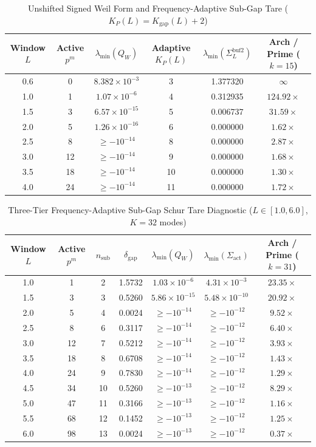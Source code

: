 \documentclass[11pt,a4paper]{article}
\begin{document}
\begin{table}[htbp]
\centering
\caption{Unshifted Signed Weil Form and Frequency-Adaptive Sub-Gap Tare ($K_P(L) = K_{\mathrm{gap}}(L) + 2$)}
\begin{tabular}{cccccc}
\toprule
Window $L$ & Active $p^m$ & $\lambda_{\min}(Q_W)$ & Adaptive $K_P(L)$ & $\lambda_{\min}(\Sigma_L^{\mathrm{buf2}})$ & Arch / Prime ($k=15$) \\
\midrule
0.6 & 0 & $8.382\times 10^{-3}$ & 3 & 1.377320 & $\infty$ \\
1.0 & 1 & $1.07\times 10^{-6}$ & 4 & 0.312935 & $124.92\times$ \\
1.5 & 3 & $6.57\times 10^{-15}$ & 5 & 0.006737 & $31.59\times$ \\
2.0 & 5 & $1.26\times 10^{-16}$ & 6 & 0.000000 & $1.62\times$ \\
2.5 & 8 & $\ge -10^{-14}$ & 8 & 0.000000 & $2.87\times$ \\
3.0 & 12 & $\ge -10^{-14}$ & 9 & 0.000000 & $1.68\times$ \\
3.5 & 18 & $\ge -10^{-14}$ & 10 & 0.000000 & $1.30\times$ \\
4.0 & 24 & $\ge -10^{-14}$ & 11 & 0.000000 & $1.72\times$ \\
\bottomrule
\end{tabular}
\end{table}

\begin{table}[htbp]
\centering
\caption{Three-Tier Frequency-Adaptive Sub-Gap Schur Tare Diagnostic ($L \in [1.0, 6.0]$, $K = 32$ modes)}
\begin{tabular}{ccccccc}
\toprule
Window $L$ & Active $p^m$ & $n_{\mathrm{sub}}$ & $\delta_{\mathrm{gap}}$ & $\lambda_{\min}(Q_W)$ & $\lambda_{\min}(\Sigma_{\mathrm{act}})$ & Arch / Prime ($k=31$) \\
\midrule
1.0 & 1 & 2 & 1.5732 & $1.03\times 10^{-6}$ & $4.31\times 10^{-3}$ & $23.35\times$ \\
1.5 & 3 & 3 & 0.5260 & $5.86\times 10^{-15}$ & $5.48\times 10^{-10}$ & $20.92\times$ \\
2.0 & 5 & 4 & 0.0024 & $\ge -10^{-14}$ & $\ge -10^{-12}$ & $9.52\times$ \\
2.5 & 8 & 6 & 0.3117 & $\ge -10^{-14}$ & $\ge -10^{-12}$ & $6.40\times$ \\
3.0 & 12 & 7 & 0.5212 & $\ge -10^{-14}$ & $\ge -10^{-12}$ & $3.93\times$ \\
3.5 & 18 & 8 & 0.6708 & $\ge -10^{-14}$ & $\ge -10^{-12}$ & $1.43\times$ \\
4.0 & 24 & 9 & 0.7830 & $\ge -10^{-14}$ & $\ge -10^{-12}$ & $1.29\times$ \\
4.5 & 34 & 10 & 0.5260 & $\ge -10^{-13}$ & $\ge -10^{-12}$ & $8.29\times$ \\
5.0 & 47 & 11 & 0.3166 & $\ge -10^{-13}$ & $\ge -10^{-12}$ & $1.16\times$ \\
5.5 & 68 & 12 & 0.1452 & $\ge -10^{-13}$ & $\ge -10^{-12}$ & $1.25\times$ \\
6.0 & 98 & 13 & 0.0024 & $\ge -10^{-13}$ & $\ge -10^{-12}$ & $0.37\times$ \\
\bottomrule
\end{tabular}
\end{table}
\end{document}
